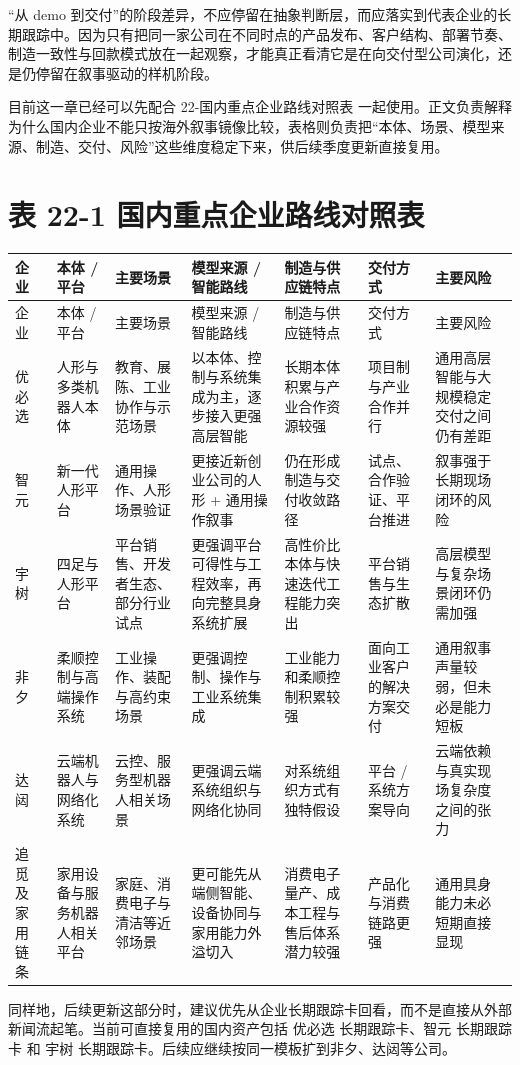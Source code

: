 “从 demo 到交付”的阶段差异，不应停留在抽象判断层，而应落实到代表企业的长期跟踪中。因为只有把同一家公司在不同时点的产品发布、客户结构、部署节奏、制造一致性与回款模式放在一起观察，才能真正看清它是在向交付型公司演化，还是仍停留在叙事驱动的样机阶段。

目前这一章已经可以先配合 22-国内重点企业路线对照表 一起使用。正文负责解释为什么国内企业不能只按海外叙事镜像比较，表格则负责把“本体、场景、模型来源、制造、交付、风险”这些维度稳定下来，供后续季度更新直接复用。

\section*{表 22-1 国内重点企业路线对照表}

\begingroup
\small
\begin{xltabular}{\textwidth}{YYYYYYY}
\toprule
企业 & 本体 / 平台 & 主要场景 & 模型来源 / 智能路线 & 制造与供应链特点 & 交付方式 & 主要风险 \\
\midrule
\endfirsthead
\toprule
企业 & 本体 / 平台 & 主要场景 & 模型来源 / 智能路线 & 制造与供应链特点 & 交付方式 & 主要风险 \\
\midrule
\endhead
优必选 & 人形与多类机器人本体 & 教育、展陈、工业协作与示范场景 & 以本体、控制与系统集成为主，逐步接入更强高层智能 & 长期本体积累与产业合作资源较强 & 项目制与产业合作并行 & 通用高层智能与大规模稳定交付之间仍有差距 \\
智元 & 新一代人形平台 & 通用操作、人形场景验证 & 更接近新创业公司的人形 + 通用操作叙事 & 仍在形成制造与交付收敛路径 & 试点、合作验证、平台推进 & 叙事强于长期现场闭环的风险 \\
宇树 & 四足与人形平台 & 平台销售、开发者生态、部分行业试点 & 更强调平台可得性与工程效率，再向完整具身系统扩展 & 高性价比本体与快速迭代工程能力突出 & 平台销售与生态扩散 & 高层模型与复杂场景闭环仍需加强 \\
非夕 & 柔顺控制与高端操作系统 & 工业操作、装配与高约束场景 & 更强调控制、操作与工业系统集成 & 工业能力和柔顺控制积累较强 & 面向工业客户的解决方案交付 & 通用叙事声量较弱，但未必是能力短板 \\
达闼 & 云端机器人与网络化系统 & 云控、服务型机器人相关场景 & 更强调云端系统组织与网络化协同 & 对系统组织方式有独特假设 & 平台 / 系统方案导向 & 云端依赖与真实现场复杂度之间的张力 \\
追觅及家用链条 & 家用设备与服务机器人相关平台 & 家庭、消费电子与清洁等近邻场景 & 更可能先从端侧智能、设备协同与家用能力外溢切入 & 消费电子量产、成本工程与售后体系潜力较强 & 产品化与消费链路更强 & 通用具身能力未必短期直接显现 \\
\bottomrule
\end{xltabular}
\endgroup

同样地，后续更新这部分时，建议优先从企业长期跟踪卡回看，而不是直接从外部新闻流起笔。当前可直接复用的国内资产包括 优必选 长期跟踪卡、智元 长期跟踪卡 和 宇树 长期跟踪卡。后续应继续按同一模板扩到非夕、达闼等公司。
